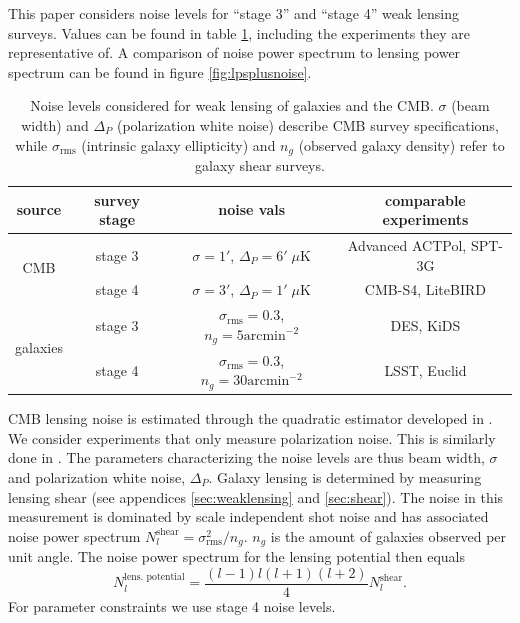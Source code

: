 \documentclass[11pt]{article} %
\begin{document}



This paper considers noise levels for ``stage 3'' and ``stage 4'' weak lensing surveys. Values can be found in table \ref{tab:noiselevels}, including the experiments they are representative of. A comparison of noise power spectrum to lensing power spectrum can be found in figure \ref{fig:lpsplusnoise}. 

\begin{table}[h]
    \centering
    \begin{tabular}{|c|c|c|c|}
    \hline
    \textbf{source} & \textbf{survey stage} & \textbf{noise vals} & \textbf{comparable experiments} \\
    \hline 
    \multirow{2}{*}{CMB} 
        & stage 3 & $\sigma = 1'$, $\Delta_P = 6' \; \mu \text{K}$ & Advanced ACTPol, SPT-3G \\
    \cline{2-4}
        & stage 4 & $\sigma = 3'$, $\Delta_P = 1' \; \mu \text{K}$ & CMB-S4, LiteBIRD \\
    \hline
    \multirow{2}{*}{galaxies} 
        & stage 3 & $\sigma_{\text{rms}} = 0.3$, $n_g = 5 \text{arcmin}^{-2}$ & DES, KiDS \\
    \cline{2-4}
        & stage 4 & $\sigma_{\text{rms}} = 0.3$, $n_g = 30 \text{arcmin}^{-2}$ & LSST, Euclid \\
    \hline
    \end{tabular}
    \caption{Noise levels considered for weak lensing of galaxies and the CMB. $\sigma$ (beam width) and $\Delta_P$ (polarization white noise) describe CMB survey specifications, while $\sigma_{\text{rms}}$ (intrinsic galaxy ellipticity) and $n_g$ (observed galaxy density) refer to galaxy shear surveys.}
    \label{tab:noiselevels}
\end{table}

CMB lensing noise is estimated through the quadratic estimator developed in \cite{cmblensingestimator}. We consider experiments that only measure polarization noise. This is similarly done in \cite{Namikawa_2016}. The parameters characterizing the noise levels are thus beam width, $\sigma$ and polarization white noise, $\Delta_P$. Galaxy lensing is determined by measuring lensing shear (see appendices \ref{sec:weaklensing} and \ref{sec:shear}). The noise in this measurement is dominated by scale independent shot noise and has associated noise power spectrum $N_l^{\text{shear}} = \sigma_{\text{rms}}^2 / n_g$. $n_g$ is the amount of galaxies observed per unit angle. The noise power spectrum for the lensing potential then equals
\begin{equation*}
    N_l^{\text{lens. potential}} = \frac{(l-1)l(l+1)(l+2)}{4}N_l^{\text{shear}}.
\end{equation*}
For parameter constraints we use stage 4 noise levels.
\end{document}
